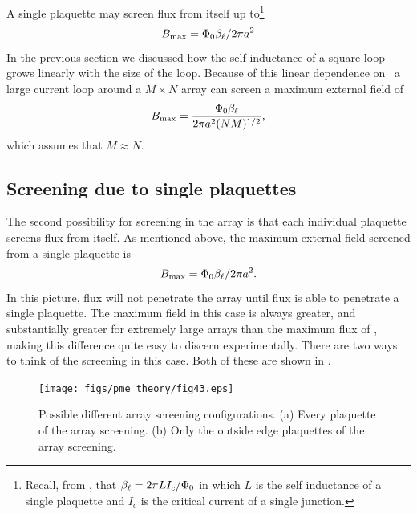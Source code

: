 A single plaquette may screen flux from 
itself up to\footnote{Recall, from , 
that $\beta_\ell = 2 \pi L I_c / \Phi_0$ in which 
$L$ is the self inductance of a single plaquette and $I_c$ is 
the critical current of a single junction.}
%
\begin{equation}
B_{\mathrm{max}} = \Phi_0 \beta_\ell /2 \pi a^2
\label{eqn:single_array_max_flux}
\end{equation}
%
In the previous section we discussed how the self inductance 
of a square loop grows linearly with the size of the loop.
Because of this linear dependence on \betal\ a  
large current loop around a $M\times N$ array  
can screen a maximum external field of 
%
\begin{equation}
B_{\mathrm{max}}={\Phi_0 \beta_\ell \over 2 \pi a^2 (NM)^{1/2} } \mbox{,}
\end{equation}
%
which assumes that $M\approx N$.

\subsection{Screening due to single plaquettes}

The second possibility for screening in the array 
is that each individual plaq\-uette 
screens flux from 
itself. As mentioned above, the maximum external field 
screened from a single plaquette is
%
\begin{equation}
B_{\mathrm{max}} = \Phi_0 \beta_\ell /2 \pi a^2. 
\end{equation}
%
In this picture, flux will not penetrate the array until flux
is able to penetrate a single plaquette. The maximum
field in this case is always greater, and substantially greater
for extremely large arrays than the maximum flux of
, making this difference
quite easy to discern experimentally. 
There are two ways to think of the screening in this case. 
Both of these are shown in . 

\begin{figure}[p]
\texttt{[image: figs/pme\_theory/fig43.eps]}
\caption[Different array screening configurations for individual
plaquettes.]
{Possible different array screening configurations. (a) Every
plaquette of the array screening. (b) Only the outside edge plaquettes
of the array screening. }
\label{fig:plaquette_screening}
\end{figure}

